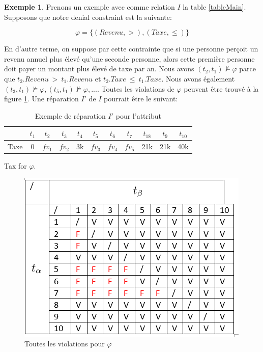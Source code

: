 \documentclass[letterpaper, 12pt]{report}
\theoremstyle{definition}
\newtheorem{myexample}{Exemple}
\begin{document}
\begin{myexample}
Prenons un exemple avec comme relation $I$ la table \ref{tableMain}. Supposons que notre denial constraint est la suivante:

$$ \varphi = \{(Revenu,>),(Taxe,\leq)\}$$

En d'autre terme, on suppose par cette contrainte que si une personne perçoit un revenu annuel plus élevé qu'une seconde personne, alors cette première personne doit payer un montant plus élevé de taxe par an. Nous avons $(t_2,t_1) \not\models \varphi$ parce que $t_2.Revenu\ >\ t_1.Revenu$ et $t_2.Taxe\ \leq\ t_1.Taxe$. Nous avons également $(t_3,t_1) \not\models \varphi,(t_5,t_1) \not\models \varphi,...$. Toutes les violations de $\varphi$ peuvent être trouvé à la figure \ref{BadTax}. Une réparation $I'$ de $I$ pourrait être le suivant:


\begin{table}[H]
	\centering
	\begin{tabular}{|c|c c c c c c c c c c|}
	\hline
	   & $t_1$ & $t_2$ & $t_3$ &$t_4$ &$t_5$ &$t_6$ &$t_7$ &$t_18$ &$t_9$ &$t_10$ \\
	\hline
	 Taxe & 0 & \color{red} $fv_1$ & \color{red} $fv_2$& 3k & \color{orange}$fv_3$& \color{orange} $fv_4$& \color{orange} $fv_5$& 21k & 21k & 40k\\
	 \hline
	\end{tabular}
	\caption{\label{tableExample} Exemple de réparation $I'$ pour l'attribut} 
	Tax for $\varphi$.
\end{table}


\begin{figure}
	\centering
	\includegraphics[scale=1]{img/TaxBad}
	\caption{\label{BadTax} Toutes les violations pour $\varphi$}
\end{figure}


\end{myexample}
\end{document}
